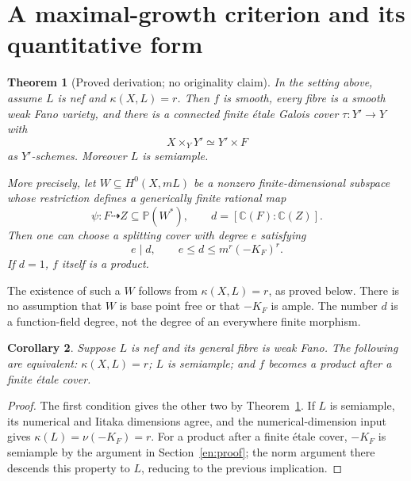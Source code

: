\documentclass[12pt]{amsart}
\newtheorem{thm}{Theorem}[section]
\newtheorem{cor}[thm]{Corollary}
\theoremstyle{definition}
\theoremstyle{remark}
\numberwithin{equation}{section}
\newcommand{\C}{\mathbb{C}}
\newcommand{\mP}{\mathbb{P}}
\begin{document}
\section{A maximal-growth criterion and its quantitative form}\label{en:main}
\begin{thm}[Proved derivation; no originality claim]\label{en:criterion}
In the setting above, assume $L$ is nef and $\kappa(X,L)=r$. Then $f$ is smooth, every fibre is a smooth weak Fano variety, and there is a connected finite \'etale Galois cover $\tau:Y'\to Y$ with
\[
 X\times_Y Y'\simeq Y'\times F
\]
as $Y'$-schemes. Moreover $L$ is semiample.

More precisely, let $W\subseteq H^0(X,mL)$ be a nonzero finite-dimensional subspace whose restriction defines a generically finite rational map
\[
 \psi:F\dashrightarrow Z\subseteq\mP(W^*),\qquad
 d=[\C(F):\C(Z)].
\]
Then one can choose a splitting cover with degree $e$ satisfying
\begin{equation}\label{en:degree}
 e\mid d,\qquad e\leq d\leq m^r(-K_F)^r.
\end{equation}
If $d=1$, $f$ itself is a product.
\end{thm}

The existence of such a $W$ follows from $\kappa(X,L)=r$, as proved below. There is no assumption that $W$ is base point free or that $-K_F$ is ample. The number $d$ is a function-field degree, not the degree of an everywhere finite morphism.

\begin{cor}\label{en:equiv}
Suppose $L$ is nef and its general fibre is weak Fano. The following are equivalent: $\kappa(X,L)=r$; $L$ is semiample; and $f$ becomes a product after a finite \'etale cover.
\end{cor}
\begin{proof}
The first condition gives the other two by Theorem~\ref{en:criterion}. If $L$ is semiample, its numerical and Iitaka dimensions agree, and the numerical-dimension input gives $\kappa(L)=\nu(-K_F)=r$. For a product after a finite \'etale cover, $-K_F$ is semiample by the argument in Section~\ref{en:proof}; the norm argument there descends this property to $L$, reducing to the previous implication.
\end{proof}
\end{document}
